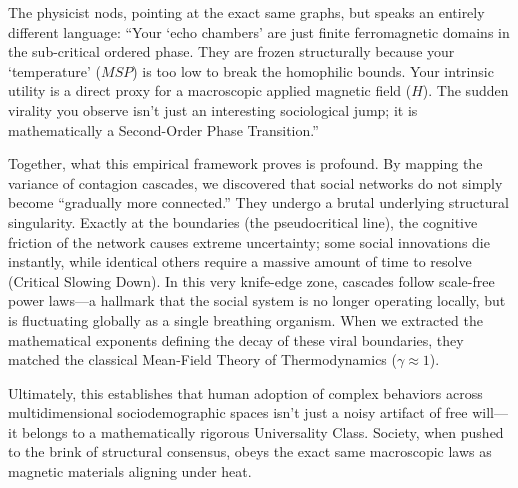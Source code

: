 \documentclass[11pt]{article}
\begin{document}
The physicist nods, pointing at the exact same graphs, but speaks an entirely different language: ``Your `echo chambers' are just finite ferromagnetic domains in the sub-critical ordered phase. They are frozen structurally because your `temperature' ($MSP$) is too low to break the homophilic bounds. Your intrinsic utility is a direct proxy for a macroscopic applied magnetic field ($H$). The sudden virality you observe isn't just an interesting sociological jump; it is mathematically a Second-Order Phase Transition.''

Together, what this empirical framework proves is profound. By mapping the variance of contagion cascades, we discovered that social networks do not simply become ``gradually more connected.'' They undergo a brutal underlying structural singularity. Exactly at the boundaries (the pseudocritical line), the cognitive friction of the network causes extreme uncertainty; some social innovations die instantly, while identical others require a massive amount of time to resolve (Critical Slowing Down). In this very knife-edge zone, cascades follow scale-free power laws—a hallmark that the social system is no longer operating locally, but is fluctuating globally as a single breathing organism. When we extracted the mathematical exponents defining the decay of these viral boundaries, they matched the classical Mean-Field Theory of Thermodynamics ($\gamma \approx 1$). 

Ultimately, this establishes that human adoption of complex behaviors across multidimensional sociodemographic spaces isn't just a noisy artifact of free will—it belongs to a mathematically rigorous Universality Class. Society, when pushed to the brink of structural consensus, obeys the exact same macroscopic laws as magnetic materials aligning under heat.
\end{document}
